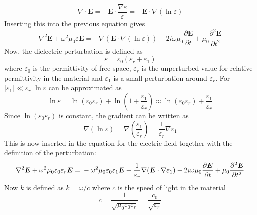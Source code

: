 \documentclass[10pt,a4paper,draft]{scrartcl}
\begin{document}
	\begin{equation*}
		\nabla \cdot \bm{E} = -\bm{E} \cdot \frac{\nabla \varepsilon}{\varepsilon} = -\bm{E} \cdot \nabla (\ln{\varepsilon})
	\end{equation*}
	Inserting this into the previous equation gives
	\begin{equation*}
		\nabla^2\bm{E} + \omega^2 \mu_0 \varepsilon \bm{E} = -\nabla(\bm{E} \cdot \nabla (\ln{\varepsilon})) - 2i\omega \mu_0 \frac{\partial \bm{E}}{\partial t} + \mu_0 \frac{\partial^2 \bm{E}}{\partial t^2}
	\end{equation*}
	Now, the dielectric perturbation is defined as
	\begin{equation*}
	\varepsilon = \varepsilon_0(\varepsilon_r + \varepsilon_1)
	\end{equation*}
	where $\varepsilon_0$ is the permittivity of free space, $\varepsilon_r$ is the unperturbed value for relative permittivity in the material and $\varepsilon_1$ is a small perturbation around $\varepsilon_r$. For $|\varepsilon_1| \ll \varepsilon_r$ $\ln{\varepsilon}$ can be approximated as
	\begin{equation*}
		\ln{\varepsilon} = \ln(\varepsilon_0 \varepsilon_r) + \ln(1 + \frac{\varepsilon_1}{\varepsilon_r}) \approx \ln(\varepsilon_0 \varepsilon_r) + \frac{\varepsilon_1}{\varepsilon_r}
	\end{equation*}
	Since $\ln(\varepsilon_0 \varepsilon_r)$ is constant, the gradient can be written as
	\begin{equation*}
		\nabla(\ln{\varepsilon}) = \nabla \left( \frac{\varepsilon_1}{\varepsilon_r} \right) = \frac{1}{\varepsilon_r} \nabla \varepsilon_1
	\end{equation*}
	This is now inserted in the equation for the electric field together with the definition of the perturbation:
	\begin{equation*}
		\nabla^2\bm{E} + \omega^2 \mu_0 \varepsilon_0 \varepsilon_r \bm{E} = \\
		 -\omega^2 \mu_0 \varepsilon_0 \varepsilon_1 \bm{E} -\frac{1}{\varepsilon_r}\nabla(\bm{E} \cdot \nabla \varepsilon_1) - 2i\omega \mu_0 \frac{\partial \bm{E}}{\partial t} + \mu_0 \frac{\partial^2 \bm{E}}{\partial t^2}
	\end{equation*}
	Now $k$ is defined as $k = \omega/c$ where $c$ is the speed of light in the material
	\begin{equation*}
		c = \frac{1}{\sqrt{\mu_0 \varepsilon_0 \varepsilon_r}} = \frac{c_0}{\sqrt{\varepsilon_r}}
	\end{equation*}
\end{document}
